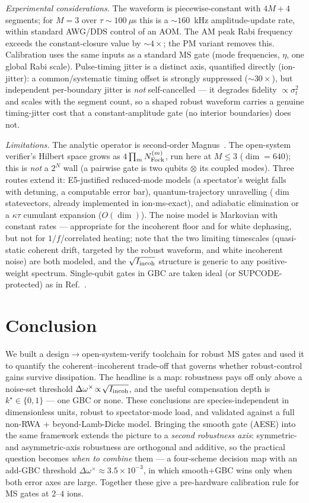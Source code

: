 \documentclass[aps,prapplied,twocolumn,superscriptaddress,floatfix,nofootinbib]{revtex4-2}
\begin{document}
\emph{Experimental considerations.} The waveform is piecewise-constant with $4M+4$ segments;
for $M=3$ over $\tau\sim100~\mu$s this is a $\sim\!160$~kHz amplitude-update rate, within
standard AWG/DDS control of an AOM. The AM peak Rabi frequency exceeds the constant-closure
value by $\sim\!4\times$; the PM variant removes this. Calibration uses the same inputs as a
standard MS gate (mode frequencies, $\eta$, one global Rabi scale). Pulse-timing jitter is a
distinct axis, quantified directly (\textsf{ion-jitter}): a common/systematic timing offset is
strongly suppressed ($\sim\!30\times$), but independent per-boundary jitter is \emph{not}
self-cancelled --- it degrades fidelity $\propto\sigma_t^2$ and scales with the segment count, so
a shaped robust waveform carries a genuine timing-jitter cost that a constant-amplitude gate (no
interior boundaries) does not.

\emph{Limitations.} The analytic operator is second-order Magnus~\cite{Zhang25}. The
open-system verifier's Hilbert space grows as $4\prod_m N_{\rm Fock}^{(m)}$, run here at
$M\!\le\!3$ ($\dim=640$); this is \emph{not} a $2^N$ wall (a pairwise gate is two qubits
$\otimes$ its coupled modes). Three routes extend it: E5-justified reduced-mode models (a
spectator's weight falls with detuning, a computable error bar), quantum-trajectory
unravelling ($\dim$ statevectors, already implemented in \textsf{ion-ms-exact}), and adiabatic
elimination or a $\kappa\tau$ cumulant expansion ($O(\dim)$). The noise model is Markovian with
constant rates --- appropriate for the incoherent floor and for white dephasing, but not for
$1/f$/correlated heating; note that the two limiting timescales (quasi-static coherent drift,
targeted by the robust waveform, and white incoherent noise) are both modeled, and the
$\sqrt{I_{\rm incoh}}$ structure is generic to any positive-weight spectrum. Single-qubit gates
in GBC are taken ideal (or SUPCODE-protected) as in Ref.~\cite{Zhang25}.

\section{Conclusion}
We built a design$\to$open-system-verify toolchain for robust MS gates and used it to quantify
the coherent--incoherent trade-off that governs whether robust-control gains survive
dissipation. The headline is a map: robustness pays off only above a noise-set threshold
$\Delta\omega^\times\!\propto\!\sqrt{I_{\rm incoh}}$, and the useful compensation depth is
$k^\star\!\in\!\{0,1\}$ --- one GBC or none. These conclusions are species-independent in
dimensionless units, robust to spectator-mode load, and validated against a full non-RWA +
beyond-Lamb-Dicke model. Bringing the smooth gate (AESE) into the same framework extends the picture
to a \emph{second robustness axis}: symmetric- and asymmetric-axis robustness are orthogonal and
additive, so the practical question becomes \emph{when to combine} them --- a four-scheme decision
map with an add-GBC threshold $\Delta\omega^\times\!\approx\!3.5\times10^{-3}$, in which smooth+GBC
wins only when both error axes are large. Together these give a pre-hardware calibration rule for
MS gates at $2$--$4$ ions.
\end{document}
